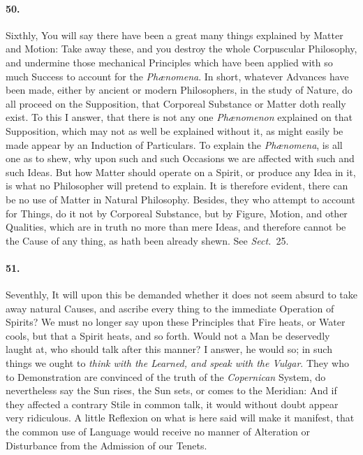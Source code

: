 \documentclass[]{article}
\newenvironment{sectionbody}{\begin{multicols}{2}}{\end{multicols}}
\begin{document}
\begin{sectionbody}
\paragraph{50.} Sixthly, You will say there have been a great many things
explained by Matter and Motion: Take away these, and you destroy
the whole Corpuscular Philosophy, and undermine those mechanical
Principles which have been applied with so much Success to
account for the \emph{Ph{\ae}nomena}.  In short, whatever
Advances have been made, either by ancient or modern
Philosophers, in the study of Nature, do all proceed on the
Supposition, that Corporeal Substance or Matter doth really
exist.  To this I answer, that there is not any one
\emph{Ph{\ae}nomenon} explained on that Supposition, which may
not as well be explained without it, as might easily be made
appear by an Induction of Particulars.  To explain the
\emph{Ph{\ae}nomena}, is all one as to shew, why upon such
and such Occasions we are affected with such and such Ideas.  But
how Matter should operate on a Spirit, or produce any Idea in it,
is what no Philosopher will pretend to explain.  It is therefore
evident, there can be no use of Matter in Natural Philosophy.
Besides, they who attempt to account for Things, do it not by
Corporeal Substance, but by Figure, Motion, and other Qualities,
which are in truth no more than mere Ideas, and therefore cannot
be the Cause of any thing, as hath been already shewn.
See \emph{Sect.}~25.



\paragraph{51.} Seventhly, It will upon this be demanded whether it does not seem
absurd to take away natural Causes, and ascribe every thing to
the immediate Operation of Spirits? We must no longer say upon
these Principles that Fire heats, or Water cools, but that a
Spirit heats, and so forth.  Would not a Man be deservedly laught
at, who should talk after this manner? I answer, he would so; in
such things we ought to \emph{think with the Learned, and speak
with the Vulgar}. They who to Demonstration are convinced of the
truth of the \emph{Copernican} System, do nevertheless say the
Sun rises, the Sun sets, or comes to the Meridian: And if they
affected a contrary Stile in common talk, it would without doubt
appear very ridiculous.  A little Reflexion on what is here said
will make it manifest, that the common use of Language would
receive no manner of Alteration or Disturbance from the Admission
of our Tenets.




\end{sectionbody}
\end{document}
